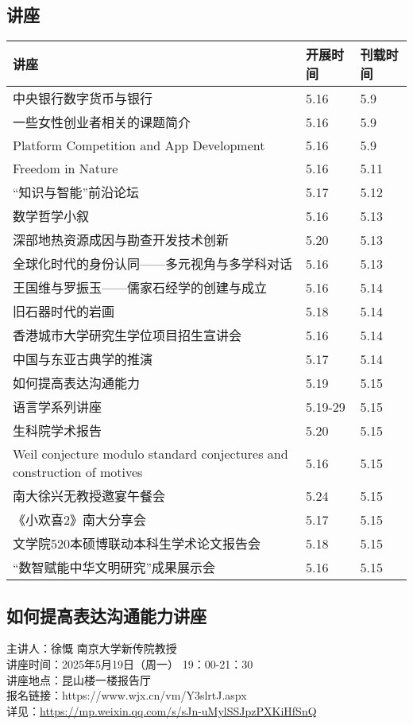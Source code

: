 \documentclass[letterpaper, 12pt]{article}
\begin{document}
\begin{multicols}{2}
\pagebreak

\section{讲座}
\begin{tabular}{|>{\centering\arraybackslash}m{}|m{}|m{}|}
    \hline
    讲座 & 开展时间 & 刊载时间\\
    \hline\hline
    中央银行数字货币与银行 & 5.16 & 5.9\\\hline
    一些女性创业者相关的课题简介 & 5.16 & 5.9\\\hline
    Platform Competition and App Development & 5.16 & 5.9\\\hline
    Freedom in Nature & 5.16 & 5.11\\\hline
    “知识与智能”前沿论坛 & 5.17 & 5.12\\\hline
    数学哲学小叙 & 5.16 & 5.13\\\hline
    深部地热资源成因与勘查开发技术创新 & 5.20 & 5.13\\\hline
    全球化时代的身份认同——多元视角与多学科对话 & 5.16 & 5.13\\\hline
    王国维与罗振玉——儒家石经学的创建与成立 & 5.16 & 5.14\\\hline
    旧石器时代的岩画 & 5.18 & 5.14\\\hline
    香港城市大学研究生学位项目招生宣讲会 & 5.16 & 5.14\\\hline
    中国与东亚古典学的推演 & 5.17 & 5.14\\\hline
    如何提高表达沟通能力 & 5.19 & 5.15\\\hline
    语言学系列讲座 & 5.19-29 & 5.15\\\hline
    生科院学术报告 & 5.20 & 5.15\\\hline
    Weil conjecture modulo standard conjectures and construction of motives & 5.16 & 5.15\\\hline
    南大徐兴无教授邀宴午餐会 & 5.24 & 5.15\\\hline
    《小欢喜2》南大分享会 & 5.17 & 5.15\\\hline
    文学院520本硕博联动本科生学术论文报告会 & 5.18 & 5.15\\\hline
    “数智赋能中华文明研究”成果展示会 & 5.16 & 5.15\\\hline

    \end{tabular}
\subsection{如何提高表达沟通能力讲座} %
主讲人：徐慨 南京大学新传院教授
\\讲座时间：2025年5月19日（周一） 19：00-21：30
\\讲座地点：昆山楼一楼报告厅
\\报名链接：https://www.wjx.cn/vm/Y3slrtJ.aspx
\\详见：\url{https://mp.weixin.qq.com/s/sJn-uMylSSJpzPXKiHfSnQ}


\end{multicols}
\end{document}
